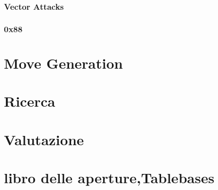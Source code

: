 \subsubsection{Vector Attacks}
\subsubsection{0x88}





\section{Move Generation} %


\section{Ricerca} %

\section{Valutazione} %

\section{libro delle aperture,Tablebases} %


